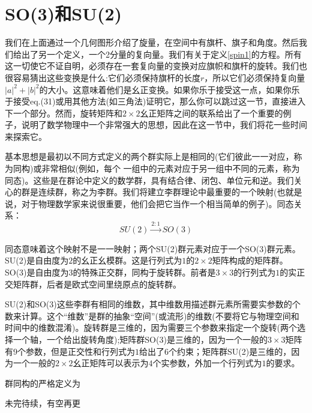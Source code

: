 \documentclass[a4paper,12pt]{article}
\begin{document}
    \section{SO(3)和SU(2)}
    我们在上面通过一个几何图形介绍了旋量，在空间中有旗杆、旗子和角度。然后我们给出了另一个定义，一个2分量的复向量。我们有关于定义\eqref{spin1}的方程。所有这一切使它不证自明，必须存在一套复向量的变换对应旗帜和旗杆的旋转。我们也很容易猜出这些变换是什么:它们必须保持旗杆的长度$r$，所以它们必须保持复向量$|a|^2 + |b|^2$的大小。这意味着他们是幺正变换。如果你乐于接受这一点，如果你乐于接受eq.(31)或用其他方法(如三角法)证明它，那么你可以跳过这一节，直接进入下一个部分。然而，旋转矩阵和$2\times 2$幺正矩阵之间的联系给出了一个重要的例子，说明了数学物理中一个非常强大的思想，因此在这一节中，我们将花一些时间来探索它。

    基本思想是最初以不同方式定义的两个群实际上是相同的(它们彼此一一对应，称为同构)或非常相似(例如，每个 一组中的元素对应于另一组中不同的元素，称为同态)。这些是在群论中定义的数学群，具有结合律、闭包、单位元和逆。我们关心的群是连续群，称之为李群。我们将建立李群理论中最重要的一个映射(也就是说，对于物理数学家来说很重要，他们会把它当作一个相当简单的例子)。同态关系：
    \begin{equation}
        SU(2)\stackrel{2:1}{\longrightarrow} SO(3)
    \end{equation}

    同态意味着这个映射不是一一映射；两个SU(2)群元素对应于一个SO(3)群元素。SU(2)是自由度为$2$的幺正幺模群。这是行列式为$1$的$2\times2$矩阵构成的矩阵群。SO(3)是自由度为$3$的特殊正交群，同构于旋转群。前者是$3\times3$的行列式为$1$的实正交矩阵群，后者是欧式空间里绕原点的旋转群。

    SU(2)和SO(3)这些李群有相同的维数，其中维数用描述群元素所需要实参数的个数来计算。这个“维数”是群的抽象“空间”(或流形)的维数(不要将它与物理空间和时间中的维数混淆)。旋转群是三维的，因为需要三个参数来指定一个旋转(两个选择一个轴，一个给出旋转角度);矩阵群SO(3)是三维的，因为一个一般的$3\times 3$矩阵有$9$个参数，但是正交性和行列式为$1$给出了$6$个约束；矩阵群SU(2)是三维的，因为一个一般的$2\times 2$幺正矩阵可以表示为$4$个实参数，外加一个行列式为$1$的要求。

    群同构的严格定义为

    未完待续，有空再更
\end{document}
